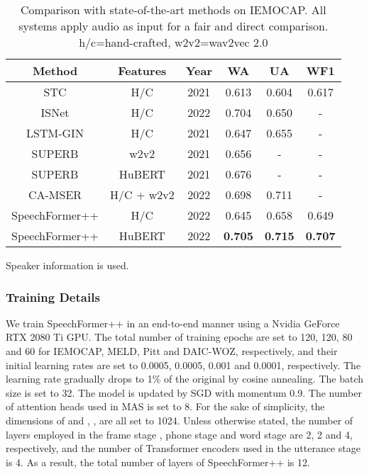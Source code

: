 \documentclass[lettersize,journal]{IEEEtran}
\begin{document}
\begin{table}[t]
    \caption{Comparison with state-of-the-art methods on IEMOCAP. All systems apply audio as input for a fair and direct comparison. h/c=hand-crafted, w2v2=wav2vec 2.0}
    \label{tab_2}
    \centering
    \begin{threeparttable}
    \begin{tabular}{ccc||ccc}
    \hline
    Method   & Features  & Year & WA  & UA & WF1   \\ \hline
    STC\cite{stc}       &  H/C     & 2021       & 0.613   & 0.604 & 0.617  \\
    \tnote{}\; ISNet\cite{ISNet}     &  H/C   & 2022         & 0.704   & 0.650  & - \\
    LSTM-GIN\cite{LSTM-GIN}  &  H/C & 2021   & 0.647   & 0.655  & -\\
    SUPERB\cite{superb} & w2v2  & 2021 & 0.656 & - & -  \\ 
    SUPERB\cite{superb} & HuBERT  & 2021 & 0.676 & - & -  \\ 
    CA-MSER\cite{CA-MSER}  & H/C + w2v2   & 2022  & 0.698   & 0.711  & - \\ \hline
    SpeechFormer++   & H/C  & 2022  & 0.645   & 0.658 & 0.649 \\
    SpeechFormer++   & HuBERT  & 2022  & \textbf{0.705}   & \textbf{0.715} & \textbf{0.707} \\ \hline
    \end{tabular}
    \begin{tablenotes}
        \footnotesize
        \item[] Speaker information is used.
    \end{tablenotes}
    \end{threeparttable}\end{table}

\subsubsection{Training Details} We train SpeechFormer++ in an end-to-end manner using a Nvidia GeForce RTX 2080 Ti GPU. The total number of training epochs are set to 120, 120, 80 and 60 for IEMOCAP, MELD, Pitt and DAIC-WOZ, respectively, and their initial learning rates are set to 0.0005, 0.0005, 0.001 and 0.0001, respectively. The learning rate gradually drops to 1\% of the original by cosine annealing. The batch size is set to 32. The model is updated by SGD with momentum 0.9. The number of attention heads used in MAS is set to 8. For the sake of simplicity, the dimensions of  and , , are all set to 1024. Unless otherwise stated, the number of layers employed in the frame stage , phone stage  and word stage  are 2, 2 and 4, respectively, and the number of Transformer encoders used in the utterance stage  is 4. As a result, the total number of layers of SpeechFormer++ is 12.
\end{document}
